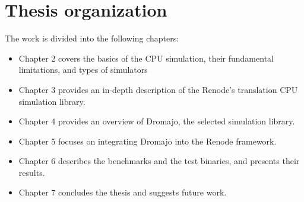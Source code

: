 \section{Thesis organization}

The work is divided into the following chapters:
\begin{itemize}
	\item{Chapter 2 covers the basics of the CPU simulation, their fundamental limitations, and types of simulators}
	\item{Chapter 3 provides an in-depth description of the Renode's translation CPU simulation library}.
	\item{Chapter 4 provides an overview of Dromajo, the selected simulation library}.
	\item{Chapter 5 focuses on integrating Dromajo into the Renode framework}.
	\item{Chapter 6 describes the benchmarks and the test binaries, and presents their results}.
	\item{Chapter 7 concludes the thesis and suggests future work}.
\end{itemize}